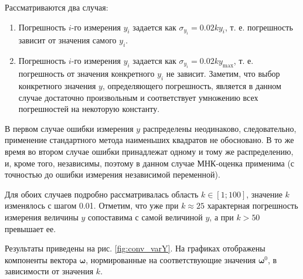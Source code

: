 \documentclass[tikz,10pt,a4paper]{article}
\newcommand{\bomega}{\boldsymbol{\omega}}
\begin{document}
Рассматриваются два случая:
\begin{enumerate}
  \item Погрешность $i$-го измерения $y_i$ задается как $\sigma_{y_i} = 0.02ky_i$, т. е.
	погрешность зависит от значения самого $y_i$.
  \item Погрешность $i$-го измерения $y_i$ задается как $\sigma_{y_i} = 0.02ky_{\max}$,
	т. е. погрешность от значения конкретного $y_i$ не зависит. Заметим, что выбор
	конкретного значения $y$, определяющего погрешность, является в данном случае
	достаточно произвольным и соответствует умножению всех погрешностей на некоторую константу.
\end{enumerate}

В первом случае ошибки измерения $y$ распределены неодинаково, следовательно, применение
стандартного метода наименьших квадратов не обосновано. В то же время во втором случае
ошибки принадлежат одному и тому же распределению, и, кроме того, независимы, поэтому
в данном случае МНК-оценка применима (с точностью до ошибки измерения независимой
переменной).

Для обоих случаев подробно рассматривалась область $k \in [1; 100]$, значение $k$
изменялось с шагом 0.01. Отметим, что уже при $k \approx 25$ характерная погрешность
измерения величины $y$ сопоставима с самой величиной $y$, а при $k > 50$ превышает ее.

Результаты приведены на рис. \ref{fig:conv_varY}.
На графиках отображены компоненты вектора $\bomega$, нормированные на
соответствующие значения $\bomega^0$, в зависимости от значения $k$.
\end{document}
